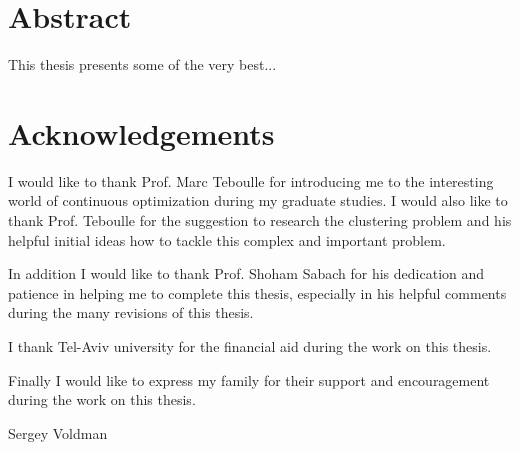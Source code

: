 \setcounter{page}{3}
\chapter*{Abstract}

This thesis presents some of the very best...




\chapter*{Acknowledgements}

I would like to thank Prof. Marc Teboulle for introducing me to the interesting world of continuous optimization during my graduate studies.    I would also like to thank Prof. Teboulle for the suggestion to research the clustering problem and his helpful initial ideas how to tackle this complex and important problem.

In addition I would like to thank Prof. Shoham Sabach for his dedication and patience in helping me to complete this thesis, especially in his helpful comments during the many revisions of this thesis.

I thank Tel-Aviv university for the financial aid during the work on this thesis.

Finally I would like to express my family for their support and encouragement during the work on this thesis.

Sergey Voldman


\nobreak

